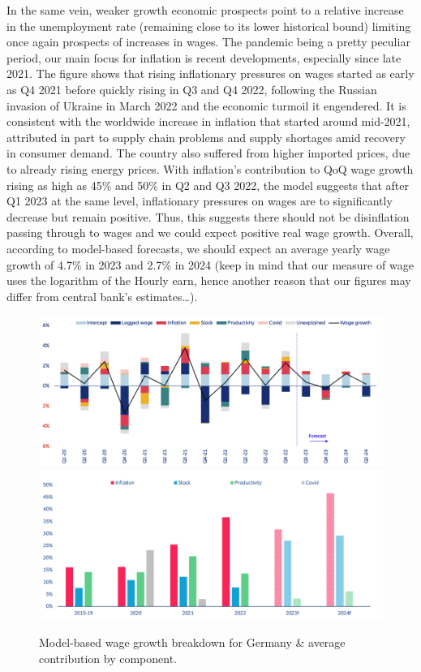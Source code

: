 In the same vein, weaker growth economic prospects point to a relative increase in the unemployment rate (remaining close to its lower historical bound) limiting once again prospects of increases in wages. 
The pandemic being a pretty peculiar period, our main focus for inflation is recent developments, especially since late 2021. 
The figure shows that rising inflationary pressures on wages started as early as Q4 2021 before quickly rising in Q3 and Q4 2022, following the Russian invasion of Ukraine in March 2022 and the economic turmoil it engendered. 
It is consistent with the worldwide increase in inflation that started around mid-2021, attributed in part to supply chain problems and supply shortages amid recovery in consumer demand. 
The country also suffered from higher imported prices, due to already rising energy prices. 
With inflation’s contribution to QoQ wage growth rising as high as 45\% and 50\% in Q2 and Q3 2022, the model suggests that after Q1 2023 at the same level, inflationary pressures on wages are to significantly decrease but remain positive. 
Thus, this suggests there should not be disinflation passing through to wages and we could expect positive real wage growth. 
Overall, according to model-based forecasts, we should expect an average yearly wage growth of 4.7\% in 2023 and 2.7\% in 2024 (keep in mind that our measure of wage uses the logarithm of the Hourly earn, hence another reason that our figures may differ from central bank’s estimates…).

\begin{figure}[H]
    \centering
    \caption{Model-based wage growth breakdown for Germany \& average contribution by component.}
    \includegraphics[width=.8\textwidth]{Core/2.Labour/img/germanyb1.png}
    \includegraphics[width=.8\textwidth]{Core/2.Labour/img/germanyb2.png}
    \label{figure:gerbreakdown}
\end{figure}

